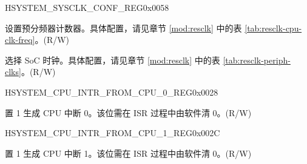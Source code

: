 \begin{register}{H}{SYSTEM\_SYSCLK\_CONF\_REG}{0x0058}\label{regdesc:SYSTEMSYSCLKCONFREG}
%
%
%
%
\regnewline%
\begin{regdesc}\begin{reglist}
\label{fielddesc:SYSTEMPREDIVCNT}\item [SYSTEM\_PRE\_DIV\_CNT] 设置预分频器计数器。具体配置，请见章节 \ref{mod:resclk} \textit{} 中的表 \ref{tab:resclk-cpu-clk-freq}。(R/W)
\label{fielddesc:SYSTEMSOCCLKSEL}\item [SYSTEM\_SOC\_CLK\_SEL] 选择 SoC 时钟。具体配置，请见章节 \ref{mod:resclk} \textit{} 中的表 \ref{tab:resclk-periph-clks}。(R/W)
\end{reglist}\end{regdesc}
\end{register}


\begin{register}{H}{SYSTEM\_CPU\_INTR\_FROM\_CPU\_0\_REG}{0x0028}\label{regdesc:SYSTEMCPUINTRFROMCPU0REG}
%
%
\regnewline%
\begin{regdesc}\begin{reglist}
\label{fielddesc:SYSTEMCPUINTRFROMCPU0}\item [SYSTEM\_CPU\_INTR\_FROM\_CPU\_0] 置 1 生成 CPU 中断 0。该位需在 ISR 过程中由软件清 0。(R/W)
\end{reglist}\end{regdesc}
\end{register}


\begin{register}{H}{SYSTEM\_CPU\_INTR\_FROM\_CPU\_1\_REG}{0x002C}\label{regdesc:SYSTEMCPUINTRFROMCPU1REG}
%
%
\regnewline%
\begin{regdesc}\begin{reglist}
\label{fielddesc:SYSTEMCPUINTRFROMCPU1}\item [SYSTEM\_CPU\_INTR\_FROM\_CPU\_1]置 1 生成 CPU 中断 1。该位需在 ISR 过程中由软件清 0。(R/W)
\end{reglist}\end{regdesc}
\end{register}



